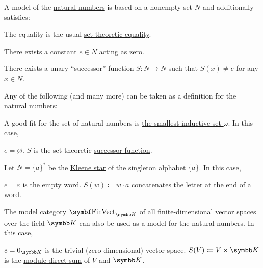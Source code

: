\begin{example}\label{ex:natural_numbers_models}
  A model of the \hyperref[def:natural_numbers]{natural numbers} is based on a nonempty set \( N \) and additionally satisfies:
  \begin{RefList}
     The equality is the usual \hyperref[def:set_zfc]{set-theoretic equality}.

     There exists a constant \( e \in N \) acting as zero.

     There exists a unary \enquote{successor} function \( S: N \to N \) such that \( S(x) \neq e \) for any \( x \in N \).
  \end{RefList}

  Any of the following (and many more) can be taken as a definition for the natural numbers:
  \begin{DefEnum}
     A good fit for the set of natural numbers is \hyperref[def:smallest_inductive_set]{the smallest inductive set \( \omega \)}. In this case,
    \begin{RefList}
       \( e = \varnothing \).
       \( S \) is the set-theoretic \hyperref[def:successor_operator]{successor function}.
    \end{RefList}

     Let \( N = \{ a \}^{*} \) be the \hyperref[def:language/kleene_star]{Kleene star} of the singleton alphabet \( \{ a \} \). In this case,
    \begin{RefList}
       \( e = \varepsilon \) is the empty word.
       \( S(w) \coloneqq w \cdot a \) concatenates the letter at the end of a word.
    \end{RefList}

     The \hyperref[def:first_order_model_category]{model category} \( \Cat{FinVect}_{\BK} \) of all \hyperref[def:vector_space_dimension]{finite-dimensional} \hyperref[def:vector_space]{vector spaces} over the field \( \BK \) can also be used as a model for the natural numbers. In this case,
    \begin{RefList}
       \( e = 0_{\BK} \) is the trivial (zero-dimensional) vector space.
       \( S(V) \coloneqq V \times \BK \) is the \hyperref[def:left_module_direct_product]{module direct sum} of \( V \) and \( \BK \).
    \end{RefList}
  \end{DefEnum}
\end{example}


